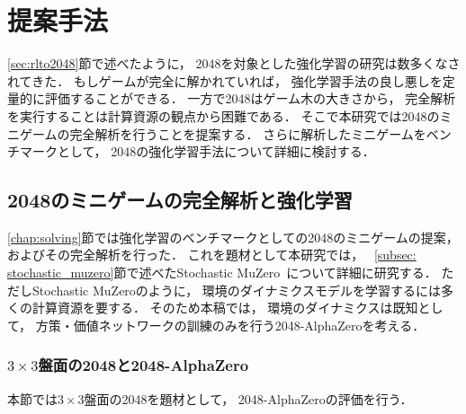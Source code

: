 \chapter{提案手法}
\label{chap:proposal}
\ref{sec:rlto2048}節で述べたように， 2048を対象とした強化学習の研究は数多くなされてきた．
もしゲームが完全に解かれていれば， 強化学習手法の良し悪しを定量的に評価することができる．
一方で2048はゲーム木の大きさから， 完全解析を実行することは計算資源の観点から困難である．
そこで本研究では2048のミニゲームの完全解析を行うことを提案する．
さらに解析したミニゲームをベンチマークとして， 2048の強化学習手法について詳細に検討する．



\section{2048のミニゲームの完全解析と強化学習}
\ref{chap:solving}節では強化学習のベンチマークとしての2048のミニゲームの提案， およびその完全解析を行った．
これを題材として本研究では， ~\ref{subsec: stochastic_muzero}節で述べたStochastic MuZero~\cite{StochasticMuZero}について詳細に研究する．
ただしStochastic MuZeroのように， 環境のダイナミクスモデルを学習するには多くの計算資源を要する．
そのため本稿では， 環境のダイナミクスは既知として， 方策・価値ネットワークの訓練のみを行う2048-AlphaZeroを考える．

\subsection{$3\times3$盤面の2048と2048-AlphaZero}
本節では$3\times3$盤面の2048を題材として， 2048-AlphaZeroの評価を行う．

